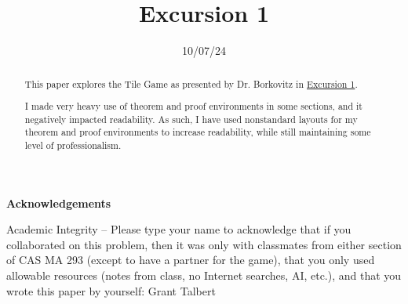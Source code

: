 \documentclass[11pt, letterpaper]{article}
\title{Excursion 1}
\date{10/07/24}
\begin{document}
\makereport
\begin{abstract}
	This paper explores the Tile Game as presented by Dr. Borkovitz in \href{https://learn-us-east-1-prod-fleet02-xythos.content.blackboardcdn.com/5deff46c33361/63408239?X-Blackboard-S3-Bucket=learn-us-east-1-prod-fleet01-xythos&X-Blackboard-Expiration=1727233200000&X-Blackboard-Signature=%2BLd6DplgbKYaPIhXzAfJOapwJ31XQ%2BUqah9dEZcpI7Q%3D&X-Blackboard-Client-Id=100902&X-Blackboard-S3-Region=us-east-1&response-cache-control=private%2C%20max-age%3D21600&response-content-disposition=inline%3B%20filename%2A%3DUTF-8%27%27Excursion%25201%2520--%2520Two-Color%2520Tile%2520Game.pdf&response-content-type=application%2Fpdf&X-Amz-Security-Token=IQoJb3JpZ2luX2VjEKb%2F%2F%2F%2F%2F%2F%2F%2F%2F%2FwEaCXVzLWVhc3QtMSJIMEYCIQDSXqYP%2FpIapJ1okMpHrDOF96Mj6KJ2HiOAPRhCUYdBrgIhAMeJyrkIpvOi7XZGKZEG2tI4w60vXL49gwWXdVgsehGhKr0FCN%2F%2F%2F%2F%2F%2F%2F%2F%2F%2F%2FwEQBBoMNjM1NTY3OTI0MTgzIgw88BMjLNBz0f6mSKIqkQVKztDxRyCG%2FNRn%2B9jZII4iSCKCEUOJtIxenwpdRh3sGilxQNwIyBBic%2Fbd7ZEEyqA0%2BDTDm3ViBOJs4vEMn2GzVUOFgOXrLRELRpgqP42QNRDNtfES3iFsS1fAKgBPHZKzGPupRwkK76nZdQUVc9Q4tB4co3xoh%2Fs2hsFrj%2FCilTkzjfpYeo5n626p3O51hT1yKT6yYr%2F0NPZbvQL%2BflsAUNTvFF2722mUneEfNeRdhTwF7v7snoZSudcA2Wuq77nGe5DFc4yrZBNIvK1j3RcnX9amVSYkQ7g06cXaTdaCT1K0PeC0tEnyjkvZV%2FB%2BfwKHT5Akfqbjw274z9EuueSXd7xGdBTATcBO%2BssH1C8AyErQXmLD5vZM6YJWeHFQn4NaKvirAmVY7cmfU2yviO9es8WGasmluK7A1a36eJzNBI1AbSwQSgEYcEI7FTbQ2Bq1gEA6sE37Wz%2FL0Ze7rbhtx6GwQB%2FkEEWNI2852T2jhj5k6LBviJBuPTQVBHRPqIVpJ7aXzT%2BX0ayg1MiTtyH7UKOdE6L2jEUYFAbQmpYyUh9liq9XP5%2FQ9lNgGlQJHrX5xwgUec2MYYjZUwn2edAVeT6EOiIHLAMyo3jNSpm3BfdjBe7WO1wqPEz0zIbQu3mmVBsQ4cclxL1bdw9QNXgd3YZXg2bF15Mbf8rtDRCfguj9qojgUeNqlb%2BgVYPGnFCa%2BvGxqsCaw853bIXX36d7PRS0VC14vCea6zx9aTxjzXhu6x%2B9KRxmQ6cyvXlVv5XekKsFf4M2oIX2B0kB79KiQR3%2FsIdHO%2FJ1%2Bste3qR1r2B8iAsMczaHQ2FJ8x9ZdZugt9Zk9OWVMNrfq%2FkzkUGCqb6sKY7XlTJf208tNlI4RLMwxdzMtwY6sAHYOMGNr6%2FHAqQdHO9Zcm4unJDaC4yKtZoWGHY%2F8Opkgxh%2F%2F9aiSyFZHcQYDooSqWtNq0CCsSSgx%2FKmzy2zeiydL7wyqRWoOl4SZDWwqpPTEbg3bDFKOvivvcf6ELUUovHjvXN3XGR1dlEJnFwQXn2o3kqWfCKA4jy0FaxLTxib81HUj%2FCBYl%2BkXgOCYmCtiEo2HLSTCmmumMl5xpi56wg2Vxutn%2Bl07YXvCbivPCwb%2BQ%3D%3D&X-Amz-Algorithm=AWS4-HMAC-SHA256&X-Amz-Date=20240924T210000Z&X-Amz-SignedHeaders=host&X-Amz-Expires=21600&X-Amz-Credential=ASIAZH6WM4PLS3QCJACU%2F20240924%2Fus-east-1%2Fs3%2Faws4_request&X-Amz-Signature=bf03a5beef9b10e472db1774d0a75240f2351b48ac548e07a0095804393cb1bd}{Excursion 1}. 

		I made very heavy use of theorem and proof environments in some sections, and it negatively impacted readability. As such, I have used nonstandard layouts for my theorem and proof environments to increase readability, while still maintaining some level of professionalism.
\end{abstract}
\begin{center}
	\textbf{\small Acknowledgements}
\end{center}
{\small Academic Integrity -- Please type your name to acknowledge that if
you collaborated on this problem, then it was only with classmates
from either section of CAS MA 293 (except to have a partner for the
game), that you only used allowable resources (notes from class, no
Internet searches, AI, etc.), and that you wrote this paper by
yourself: Grant Talbert}
\tableofcontents
\newpage
\end{document}
